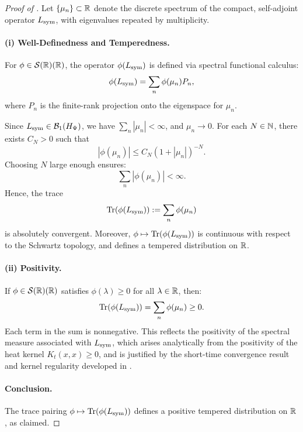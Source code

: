 \begin{proof}[Proof of ]
Let \( \{ \mu_n \} \subset \mathbb{R} \) denote the discrete spectrum of the compact, self-adjoint operator \( L_{\mathrm{sym}} \), with eigenvalues repeated by multiplicity.

\paragraph{(i) Well-Definedness and Temperedness.}
For \( \phi \in \mathcal{S}(\mathbb{R})(\mathbb{R}) \), the operator \( \phi(L_{\mathrm{sym}}) \) is defined via spectral functional calculus:
\[
\phi(L_{\mathrm{sym}}) = \sum_n \phi(\mu_n) P_n,
\]
where \( P_n \) is the finite-rank projection onto the eigenspace for \( \mu_n \).

Since \( L_{\mathrm{sym}} \in \mathcal{B}_1(H_{\Psi}) \), we have \( \sum_n |\mu_n| < \infty \), and \( \mu_n \to 0 \). For each \( N \in \mathbb{N} \), there exists \( C_N > 0 \) such that
\[
|\phi(\mu_n)| \le C_N (1 + |\mu_n|)^{-N}.
\]
Choosing \( N \) large enough ensures:
\[
\sum_n |\phi(\mu_n)| < \infty.
\]
Hence, the trace
\[
\operatorname{Tr}(\phi(L_{\mathrm{sym}})) := \sum_n \phi(\mu_n)
\]
is absolutely convergent. Moreover, \( \phi \mapsto \operatorname{Tr}(\phi(L_{\mathrm{sym}})) \) is continuous with respect to the Schwartz topology, and defines a tempered distribution on \( \mathbb{R} \).

\paragraph{(ii) Positivity.}
If \( \phi \in \mathcal{S}(\mathbb{R})(\mathbb{R}) \) satisfies \( \phi(\lambda) \ge 0 \) for all \( \lambda \in \mathbb{R} \), then:
\[
\operatorname{Tr}(\phi(L_{\mathrm{sym}})) = \sum_n \phi(\mu_n) \ge 0.
\]
Each term in the sum is nonnegative. This reflects the positivity of the spectral measure associated with \( L_{\mathrm{sym}} \), which arises analytically from the positivity of the heat kernel \( K_t(x,x) \ge 0 \), and is justified by the short-time convergence result  and kernel regularity developed in .

\paragraph{Conclusion.}
The trace pairing \( \phi \mapsto \operatorname{Tr}(\phi(L_{\mathrm{sym}})) \) defines a positive tempered distribution on \( \mathbb{R} \), as claimed.
\end{proof}
